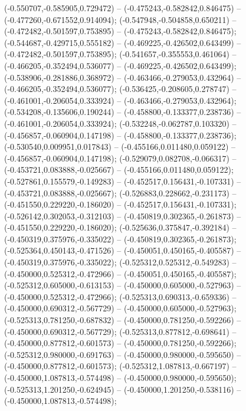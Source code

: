  (-0.550707,-0.585905,0.729472) -- (-0.475243,-0.582842,0.846475) -- (-0.477260,-0.671552,0.914094);
 (-0.547948,-0.504858,0.650211) -- (-0.472482,-0.501597,0.753895) -- (-0.475243,-0.582842,0.846475);
 (-0.544687,-0.429715,0.555182) -- (-0.469225,-0.426502,0.643499) -- (-0.472482,-0.501597,0.753895);
 (-0.541657,-0.355553,0.461064) -- (-0.466205,-0.352494,0.536077) -- (-0.469225,-0.426502,0.643499);
 (-0.538906,-0.281886,0.368972) -- (-0.463466,-0.279053,0.432964) -- (-0.466205,-0.352494,0.536077);
 (-0.536425,-0.208605,0.278747) -- (-0.461001,-0.206054,0.333924) -- (-0.463466,-0.279053,0.432964);
 (-0.534208,-0.135606,0.190244) -- (-0.458800,-0.133377,0.238736) -- (-0.461001,-0.206054,0.333924);
 (-0.532248,-0.062787,0.103320) -- (-0.456857,-0.060904,0.147198) -- (-0.458800,-0.133377,0.238736);
 (-0.530540,0.009951,0.017843) -- (-0.455166,0.011480,0.059122) -- (-0.456857,-0.060904,0.147198);
 (-0.529079,0.082708,-0.066317) -- (-0.453721,0.083888,-0.025667) -- (-0.455166,0.011480,0.059122);
 (-0.527861,0.155579,-0.149283) -- (-0.452517,0.156431,-0.107331) -- (-0.453721,0.083888,-0.025667);
 (-0.526883,0.228662,-0.231173) -- (-0.451550,0.229220,-0.186020) -- (-0.452517,0.156431,-0.107331);
 (-0.526142,0.302053,-0.312103) -- (-0.450819,0.302365,-0.261873) -- (-0.451550,0.229220,-0.186020);
 (-0.525636,0.375847,-0.392184) -- (-0.450319,0.375976,-0.335022) -- (-0.450819,0.302365,-0.261873);
 (-0.525364,0.450143,-0.471526) -- (-0.450051,0.450165,-0.405587) -- (-0.450319,0.375976,-0.335022);
 (-0.525312,0.525312,-0.549283) -- (-0.450000,0.525312,-0.472966) -- (-0.450051,0.450165,-0.405587);
 (-0.525312,0.605000,-0.613153) -- (-0.450000,0.605000,-0.527963) -- (-0.450000,0.525312,-0.472966);
 (-0.525313,0.690313,-0.659336) -- (-0.450000,0.690312,-0.567729) -- (-0.450000,0.605000,-0.527963);
 (-0.525313,0.781250,-0.687832) -- (-0.450000,0.781250,-0.592266) -- (-0.450000,0.690312,-0.567729);
 (-0.525313,0.877812,-0.698641) -- (-0.450000,0.877812,-0.601573) -- (-0.450000,0.781250,-0.592266);
 (-0.525312,0.980000,-0.691763) -- (-0.450000,0.980000,-0.595650) -- (-0.450000,0.877812,-0.601573);
 (-0.525312,1.087813,-0.667197) -- (-0.450000,1.087813,-0.574498) -- (-0.450000,0.980000,-0.595650);
 (-0.525313,1.201250,-0.624945) -- (-0.450000,1.201250,-0.538116) -- (-0.450000,1.087813,-0.574498);
